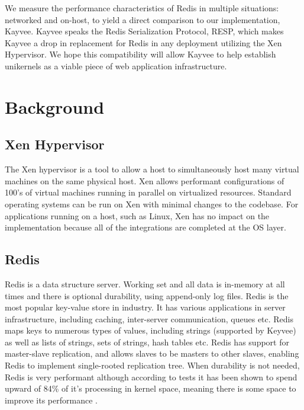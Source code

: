 \documentclass[english,10pt,twocolumn]{article}
\begin{document}
We measure the performance characteristics of Redis in multiple situations: networked and on-host, to yield a direct comparison to our implementation, Kayvee.
Kayvee speaks the Redis Serialization Protocol\cite{redis-protocol}, RESP, which makes Kayvee a drop in replacement for Redis in any deployment utilizing the Xen Hypervisor.
We hope this compatibility will allow Kayvee to help establish unikernels as a viable piece of web application infrastructure.


\section{Background}



\subsection{Xen Hypervisor}

The Xen hypervisor is a tool to allow a host to simultaneously host many virtual machines on the same physical host.
Xen allows performant configurations of 100's of virtual machines running in parallel on virtualized resources.
Standard operating systems can be run on Xen with minimal changes to the codebase.
For applications running on a host, such as Linux, Xen has no impact on the implementation because all of the integrations are completed at the OS layer.


\subsection{Redis}

Redis is a data structure server.
Working set and all data is in-memory at all times and there is optional durability, using append-only log files.
Redis is the most popular key-value store in industry\cite{dbengines}.
It has various applications in server infrastructure, including caching, inter-server communication, queues etc.
Redis maps keys to numerous types of values, including strings (supported by Keyvee) as well as lists of strings, sets of strings, hash tables etc.
Redis has support for master-slave replication, and allows slaves to be masters to other slaves, enabling Redis to implement single-rooted replication tree.
When durability is not needed, Redis is very performant although according to tests it has been shown to spend upward of 84\% of it's processing in kernel space, meaning there is some space to improve its performance \cite{latency}.
\end{document}
